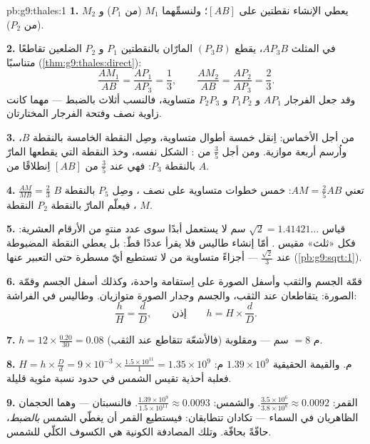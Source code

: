 \begin{solution}{pb:g9:thales:1}
\textbf{1.} يعطي الإنشاء نقطتين على $[AB]$؛
ولنسمِّهما $M_1$ (من $P_1$) و $M_2$ (من $P_2$).

\textbf{2.} في المثلث $A P_3 B$، يقطع  
$(P_3 B)$ المارّان بالنقطتين $P_1$ و $P_2$ الضلعين تقاطعًا
متناسبًا (\cref{thm:g9:thales:direct}):
\[
\frac{A M_1}{AB} = \frac{A P_1}{A P_3} = \frac13,
\qquad
\frac{A M_2}{AB} = \frac{A P_2}{A P_3} = \frac23 .
\]
وقد جعل الفرجار $A P_1$ و $P_1 P_2$ و $P_2 P_3$ متساوية، فالنسب
أثلاث بالضبط --- مهما كانت زاوية نصف  وفتحة الفرجار
المختارتان.

\textbf{3.} من أجل الأخماس: اِنقل خمسة أطوال متساوية، وصِل النقطة
الخامسة بالنقطة $B$، واُرسم أربعة  موازية. ومن أجل
$\frac35$ من : الشكل نفسه، وخذ النقطة التي يقطعها 
المارّ بالنقطة $P_3$: فهي عند $\frac{3}{5}$ من $[AB]$ اِنطلاقًا من $A$.

\textbf{4.} $\frac{AM}{MB} = \frac23$ تعني
$AM = \frac25 AB$: خمس خطوات متساوية على نصف ، وصِل $P_5$
بالنقطة $B$، فيعلّم  المارّ بالنقطة $P_2$ النقطة $M$.

\textbf{5.} قياس $\sqrt2 = 1.41421\ldots$ سم لا يستعمل أبدًا سوى
عدد منتهٍ من الأرقام العشرية: فكل «ثلث» مقيس . أمّا إنشاء
طاليس فلا يقرأ عددًا قطّ: بل يعطي النقطة المضبوطة عند
$\frac{\sqrt2}{3}$ --- أجزاءً متساوية من  لا تستطيع أيّ
مسطرة حتى التعبير عنها
(\cref{pb:g9:sqrt:1}).

\textbf{6.} قمّة الجسم والثقب وأسفل الصورة على اِستقامة واحدة،
وكذلك أسفل الجسم وقمّة الصورة:  يتقاطعان عند الثقب،
والجسم وجدار الصورة متوازيان. وطاليس في الفراشة:
\[
\frac{h}{H} = \frac{d}{D},
\qquad\text{إذن}\qquad
h = H \times \frac dD .
\]

\textbf{7.} $h = 12 \times \frac{0.20}{30} = 0.08$ م $= 8$ سم
--- ومقلوبة (فالأشعّة تتقاطع عند الثقب).

\textbf{8.} $H = h \times \frac Dd = 9 \times 10^{-3} \times
\frac{1.5 \times 10^{11}}{1} = 1.35 \times 10^{9}$ م. والقيمة
الحقيقية $1.39 \times 10^9$ م: فعلبة أحذية تقيس الشمس في حدود
نسبة مئوية قليلة.

\textbf{9.} القمر: $\frac{3.5 \times 10^6}{3.8 \times 10^8}
\approx 0.0092$. والشمس: $\frac{1.39 \times 10^9}{1.5 \times
10^{11}} \approx 0.0093$. فالنسبتان --- وهما الحجمان الظاهريان
في السماء --- تكادان تتطابقان: فيستطيع القمر أن يغطّي الشمس
\emph{بالضبط}، حافّةً بحافّة. وتلك المصادفة الكونية هي الكسوف
الكلّي للشمس.


\end{solution}
